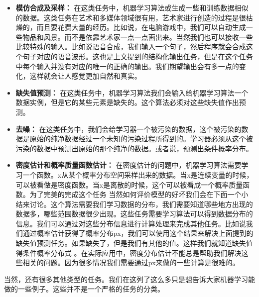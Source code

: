 \begin{itemize}
\item \textbf{模仿合成及采样：}  在这类任务中，机器学习算法或生成一些和训练数据相似的数据。这类任务在艺术和多媒体领域很有用，艺术家进行创造的过程是很枯燥的，而且要花费大量的经历。比如说，在电脑游戏中，我们可以自动生成一些物品和风景。而不是依靠艺术家一点一点画出来。当然我们也可以接收一些比较特殊的输入。比如说语音合成，我们输入一个句子，然后程序就会合成这个句子对应的语音波形。这也是上文提到的结构化输出任务，但是在这个任务中每个输入并没有对应的唯一的正确的输出。我们期望输出会有多一点的变化，这样就会让人感觉更加自然和真实。

\item \textbf{缺失值预测：} 在这类任务中，机器学习算法我们会输入给机器学习算法一个数据实例，但是它的某些元素是缺失的。这个算法必须对这些缺失值作出预测。

\item \textbf{去噪：} 在这类任务中，我们会给学习器一个被污染的数据，这个被污染的数据是原始的纯净数据经过一个未知的污染过程所得到的。学习器必须从这个被污染的数据中预测出原始的那个纯净的数据。或者说，预测出条件概率分布。

\item \textbf{密度估计和概率质量函数估计：} 在密度估计的问题中，机器学习算法需要学习一个函数。x从某个概率分布空间采样出来的数据。当x是连续变量的时候， 可以被看做是密度函数。当x是离散的时候，这个可以被看成一个概率质量函数。为了完美的完成这个任务 当然如何评价模型的好坏我们会在下面一个小结来讨论。这个算法需要我们学习数据的分布，我们需要知道哪些地方出现的数据多，哪些范围数据很少出现。这些任务需要学习算法可以得到数据分布的信息。我们可以通过对这些分布信息进行计算处理来完成其他任务。比如说我们通过概率估计获得了概率分布px，我们可以使用这个结果来解决上面提到的缺失值预测任务。如果缺失了，但是我们有其他的值。这样我们就知道缺失值得条件概率分布式 。在实际应用中，密度分布估计不能总是帮助我们解决这些相关的问题。因为很多情况我们需要通过px来做的一些计算是很难的。
\end{itemize}

当然，还有很多其他类型的任务。我们在这列了这么多只是想告诉大家机器学习能做的一些例子。这些并不是一个严格的任务的分类。


